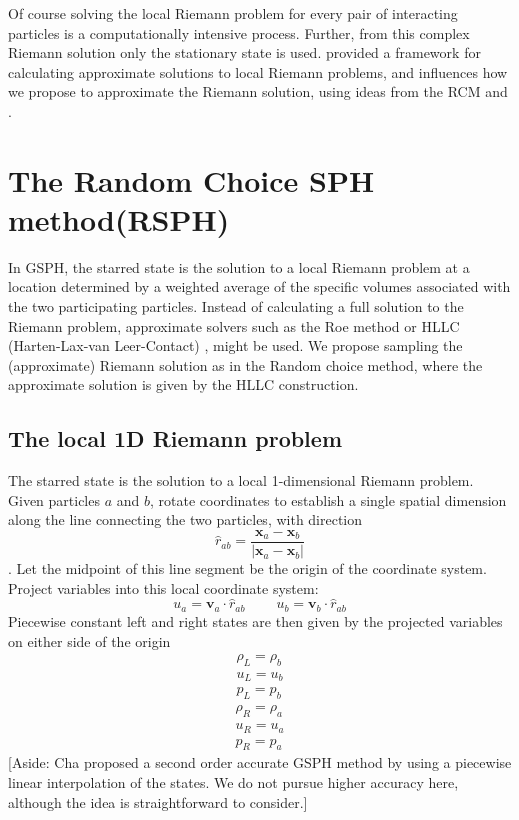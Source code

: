 \documentclass[review]{elsarticle}
\begin{document}
Of course solving the local Riemann problem for every pair of interacting particles is a computationally intensive process. Further, from this complex Riemann solution only the stationary state is used. \citet{hll} provided a framework for calculating approximate solutions to local Riemann problems, and influences how we propose to approximate the  Riemann solution, using ideas from the RCM and \citet{hartenlax}.

\section{The Random Choice SPH method(RSPH)} \label{sec:RSPH-method}
In GSPH, the starred state is the solution to a local Riemann problem at a location determined by a weighted average of the specific volumes associated with the two participating particles. 
Instead of calculating a full solution to the Riemann problem, approximate solvers such as the Roe method \citep{roe1981approximate} or HLLC (Harten-Lax-van Leer-Contact) \citep{toro1994restoration}, might be used. 
We propose sampling the (approximate) Riemann solution as in the Random choice method, where the approximate solution is given by the HLLC construction.

\subsection{The local 1D Riemann problem} \label{sec:RP-construction}
The starred state is the solution to a local 1-dimensional Riemann problem. Given particles $a$ and $b$, rotate coordinates to establish a single spatial dimension along the line connecting the two particles, with direction 
\begin{equation}
\hat{r}_{a b}= \frac{\textbf{x}_{a} - \textbf{x}_{ b}}{|\textbf{x}_{a} - \textbf{x}_{ b}|}
\end{equation}. 
Let the midpoint of this line segment be the origin of the coordinate system. Project variables into this local coordinate system:
\begin{equation}
u_{a}= \textbf{v}_{a} \cdot \hat{r}_{a b}
~~~~~~~~~~
u_{b}= \textbf{v}_{b} \cdot \hat{r}_{a b}
\label{eq:RP-project-2-local}
\end{equation}
Piecewise constant left and right states are then given by the projected variables on either side of the origin
\begin{eqnarray}
\rho_L = \rho_b 
\label{eq:Riemann-Prob-define-L-rho} \\
u_L = u_b 
\label{eq:Riemann-Prob-define-L-v} \\
p_L = p_b 
\label{eq:Riemann-Prob-define-L-p}
\end{eqnarray}
\begin{eqnarray}
\rho_R = \rho_a 
\label{eq:Riemann-Prob-define-R-rho} \\
u_R = u_a 
\label{eq:Riemann-Prob-define-R-v} \\
p_R = p_a 
\label{eq:Riemann-Prob-define-R-p}
\end{eqnarray}
[Aside: Cha \cite{cha2003implementations} proposed a second order accurate GSPH method by using
a piecewise linear interpolation of the states. We do not pursue higher accuracy here, although the idea is straightforward to consider.]
\end{document}
